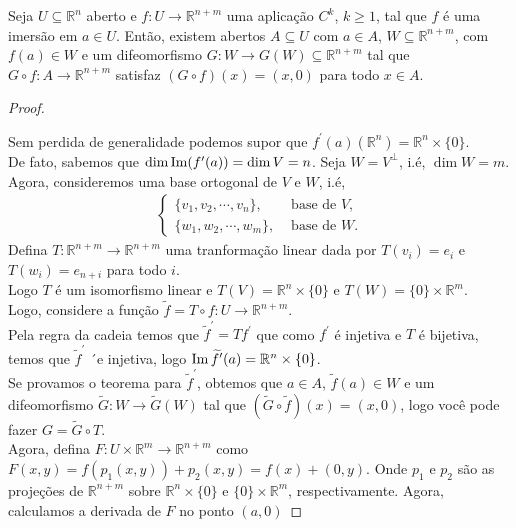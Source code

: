 \begin{theorem}
  Seja $U\subseteq \mathbb{R}^{n}$ aberto e $f:U\to\mathbb{R}^{n+m}$ uma aplicação $C^{k}$, $k\geq 1$, tal que $f$ é uma imersão em $a\in U$. Então, existem abertos $A\subseteq U$ com $a\in A$, $W\subseteq \mathbb{R}^{n+m}$, com $f(a)\in W$ e um difeomorfismo $G:W\to G(W)\subseteq\mathbb{R}^{n+m}$ tal que $G\circ f:A\to\mathbb{R}^{n+m}$ satisfaz $(G\circ f)(x)=(x,0)$ para todo $x\in A$. 
\end{theorem}
\begin{proof} 
  \begin{center}
     
  \end{center}
  Sem perdida  de generalidade podemos supor que $f^{\prime}(a)(\mathbb{R}^{n})=\mathbb{R}^{n}\times\{0\}$.\\
  De fato, sabemos que $\dim \operatorname{Im}(f^{\prime}(a))=\dim V=n$. Seja $W=V^{\perp}$, i.é, $\dim W=m$. Agora, consideremos uma base ortogonal de $V$ e $W$, i.é, 
  \begin{align*}
    \begin{cases}
      \{v_1,v_2,\cdots,v_n\}, &\text{ base de } V \text{,} \\
      \{w_1,w_2,\cdots,w_m\}, &\text{ base de } W.
    \end{cases}
  \end{align*}
  Defina $T:\mathbb{R}^{n+m}\to\mathbb{R}^{n+m}$ uma tranformação linear dada por $T(v_i)=e_i$ e $T(w_i)=e_{n+i}$ para todo $i$.\\
  Logo $T$ é um isomorfismo linear e $T(V)=\mathbb{R}^{n}\times\{0\}$ e $T(W)=\{0\}\times\mathbb{R}^{m}$.\\
  Logo, considere a função $\tilde{f}=T\circ f:U\to\mathbb{R}^{n+m}$.\\
  Pela regra da cadeia temos que $\tilde{f}^{\prime}=Tf^{\prime}$ que como $f^{\prime}$ é injetiva e $T$ é bijetiva, temos que $\tilde{f}^{\prime}$ ´e injetiva, logo $\operatorname{Im} \widetilde{f}^{\prime}(a)=\mathbb{R}^{n}\times \{0\}$.\\
  Se provamos o teorema para $\tilde{f}^{\prime}$, obtemos que $a\in A$, $\tilde{f}(a)\in W$ e um difeomorfismo $\tilde{G}:W\to\tilde{G}(W)$ tal que $(\tilde{G}\circ\tilde{f})(x)=(x,0)$, logo você pode fazer $G=\tilde{G}\circ T$.\\
  Agora, defina $F:U\times \mathbb{R}^{m}\to\mathbb{R}^{n+m}$ como $F(x,y)=f(p_1(x,y))+p_2(x,y)=f(x)+(0,y)$. Onde $p_1$ e $p_2$ são as projeções de $\mathbb{R}^{n+m}$ sobre $\mathbb{R}^{n}\times\{0\}$ e $\{0\}\times\mathbb{R}^{m}$, respectivamente. Agora, calculamos a derivada de $F$ no ponto $(a,0)$

\end{proof}
